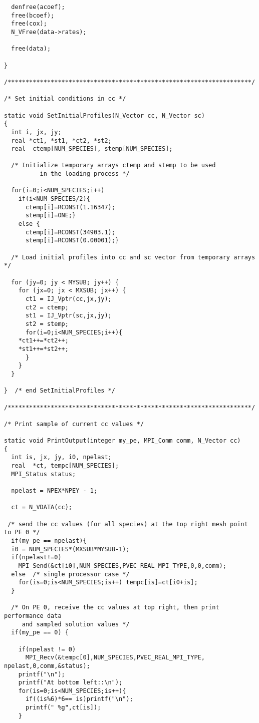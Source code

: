 \begin{verbatim}
  denfree(acoef);
  free(bcoef);
  free(cox);
  N_VFree(data->rates);

  free(data);

}

/********************************************************************/

/* Set initial conditions in cc */

static void SetInitialProfiles(N_Vector cc, N_Vector sc)
{
  int i, jx, jy;
  real *ct1, *st1, *ct2, *st2;
  real  ctemp[NUM_SPECIES], stemp[NUM_SPECIES];

  /* Initialize temporary arrays ctemp and stemp to be used
          in the loading process */

  for(i=0;i<NUM_SPECIES;i++)
    if(i<NUM_SPECIES/2){
      ctemp[i]=RCONST(1.16347);
      stemp[i]=ONE;}
    else {
      ctemp[i]=RCONST(34903.1);
      stemp[i]=RCONST(0.00001);}

  /* Load initial profiles into cc and sc vector from temporary arrays */

  for (jy=0; jy < MYSUB; jy++) {
    for (jx=0; jx < MXSUB; jx++) {
      ct1 = IJ_Vptr(cc,jx,jy);
      ct2 = ctemp;
      st1 = IJ_Vptr(sc,jx,jy);
      st2 = stemp;
      for(i=0;i<NUM_SPECIES;i++){
	*ct1++=*ct2++;
	*st1++=*st2++;
      }
    }
  }

}  /* end SetInitialProfiles */

/********************************************************************/

/* Print sample of current cc values */

static void PrintOutput(integer my_pe, MPI_Comm comm, N_Vector cc)
{
  int is, jx, jy, i0, npelast;
  real  *ct, tempc[NUM_SPECIES];
  MPI_Status status;

  npelast = NPEX*NPEY - 1;

  ct = N_VDATA(cc);

 /* send the cc values (for all species) at the top right mesh point to PE 0 */
  if(my_pe == npelast){
  i0 = NUM_SPECIES*(MXSUB*MYSUB-1);
  if(npelast!=0)
    MPI_Send(&ct[i0],NUM_SPECIES,PVEC_REAL_MPI_TYPE,0,0,comm);
  else  /* single processor case */
    for(is=0;is<NUM_SPECIES;is++) tempc[is]=ct[i0+is];   
  }

  /* On PE 0, receive the cc values at top right, then print performance data 
     and sampled solution values */
  if(my_pe == 0) {

    if(npelast != 0)
      MPI_Recv(&tempc[0],NUM_SPECIES,PVEC_REAL_MPI_TYPE, npelast,0,comm,&status);
    printf("\n");
    printf("At bottom left::\n");
    for(is=0;is<NUM_SPECIES;is++){
      if((is%6)*6== is)printf("\n");
      printf(" %g",ct[is]);
    }


\end{verbatim}

